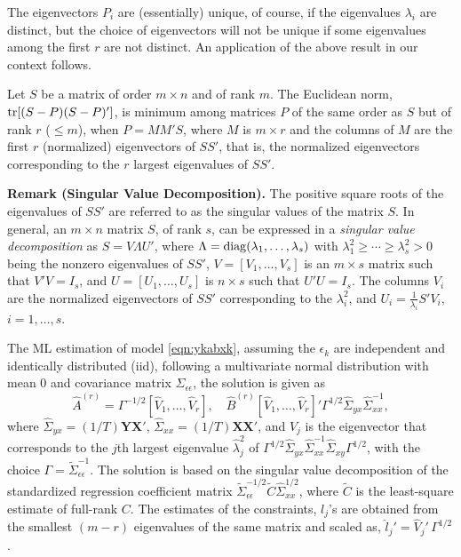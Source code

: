 The eigenvectors $P_i$ are (essentially) unique, of course, if the eigenvalues $\lambda_i$ are distinct, but the choice of eigenvectors will not be unique if some eigenvalues among the first $r$ are not distinct. An application of the above result in our context follows. 


\begin{result} \label{res:3} 
Let $S$ be a matrix of order $m \times n$ and of rank $m$. The Euclidean norm, $\operatorname{tr}[(S-P)(S-P)']$, is minimum among matrices $P$ of the same order  as $S$ but of rank $r$ ($\leq m$), when $P= MM'S$, where $M$ is $m \times r$ and the columns of $M$ are the first $r$ (normalized) eigenvectors of $SS'$, that is, the normalized eigenvectors corresponding to the $r$ largest eigenvalues of $SS'$. 
\end{result}


\noindent\textbf{Remark (Singular Value Decomposition).} The positive square roots of the eigenvalues of $SS'$ are referred to as the singular values of the matrix $S$. In general, an $m \times n$ matrix $S$, of rank $s$, can be expressed in a \emph{singular value decomposition} as $S= V \Lambda U'$, where $\Lambda= \operatorname{diag}(\lambda_1, \ldots, \lambda_s)$ with $\lambda_1^2 \geq \cdots \geq \lambda_s^2 > 0$ being the nonzero eigenvalues of $SS'$, $V= [V_1, \ldots, V_s]$ is an $m \times s$ matrix such that $V' V= I_s$, and $U= [U_1, \ldots, U_s]$ is $n \times s$ such that $U'U= I_s$. The columns $V_i$ are the normalized eigenvectors of $SS'$ corresponding to the $\lambda_i^2$, and $U_i= \frac{1}{\lambda_i}S'V_i$, $i=1, \ldots, s$. \twomedskip


The ML estimation of model \eqref{eqn:ykabxk}, assuming the $\epsilon_k$ are independent and identically distributed (iid), following a multivariate normal distribution with mean 0 and covariance matrix $\Sigma_{\epsilon\epsilon}$, the solution is given as 
	\begin{equation} \label{eqn:covarmatrixsol}
	\hat{A}^{(r)}= \Gamma^{-1/2} [\hat{V}_1, \ldots, \hat{V}_r], \quad \hat{B}^{(r)}[ \hat{V}_1, \ldots, \hat{V}_r]' \Gamma^{1/2} \hat{\Sigma}_{yx} \hat{\Sigma}_{xx}^{-1},
	\end{equation}
where $\hat{\Sigma}_{yx}= (1/T) \mathbf{Y} \mathbf{X}'$, $\hat{\Sigma}_{xx}= (1/T) \mathbf{X} \mathbf{X}'$, and $\hat{V}_j$ is the eigenvector that corresponds to the $j$th largest eigenvalue $\hat{\lambda}_j^2$ of $\Gamma^{1/2} \hat{\Sigma}_{yx} \hat{\Sigma}_{xx}^{-1} \hat{\Sigma}_{xy}\Gamma^{1/2}$, with the choice $\Gamma= \tilde{\Sigma}_{\epsilon\epsilon}^{-1}$. The solution is based on the singular value decomposition of the standardized regression coefficient matrix $\tilde{\Sigma}_{\epsilon\epsilon}^{-1/2} \tilde{C} \hat{\Sigma}_{xx}^{1/2}$, where $\tilde{C}$ is the least-square estimate of full-rank $C$. The estimates of the constraints, $l_j$'s are obtained from the smallest $(m-r)$ eigenvalues of the same matrix and scaled as, $\hat{l}_j' = \hat{V}_j' \, \Gamma^{1/2}$. 


